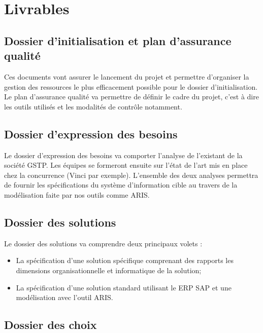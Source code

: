 \section{Livrables}

\subsection{Dossier d'initialisation et plan d'assurance qualité}

Ces documents vont assurer le lancement du projet et permettre d'organiser
la gestion des ressources le plus efficacement possible pour le dossier d'initialisation.
Le plan d'assurance qualité va permettre de définir le cadre du projet, c'est à dire les outils utilisés et les modalités de contrôle notamment. 

\subsection{Dossier d'expression des besoins}

Le dossier d'expression des besoins va comporter l'analyse de l'existant
de la société GSTP. Les équipes se formeront ensuite sur l'état de l'art
mis en place chez la concurrence (Vinci par exemple). L'ensemble des deux
analyses permettra de fournir les spécifications du système d'information cible
au travers de la modélisation faite par nos outils comme ARIS. 

\subsection{Dossier des solutions}

Le dossier des solutions va comprendre deux principaux volets :
\begin{itemize}
    \item La spécification d'une solution spécifique comprenant des rapports
        les dimensions organisationnelle et informatique de la solution;
    \item La spécification d'une solution standard utilisant le ERP SAP et une
        modélisation avec l'outil ARIS.
\end{itemize}

\subsection{Dossier des choix}

